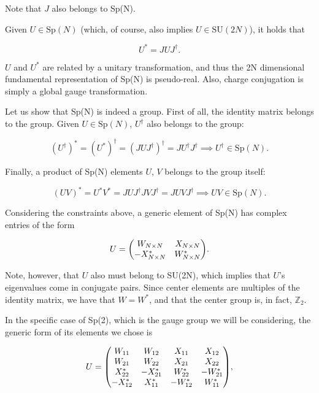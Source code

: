 \documentclass[reqno,12pt]{article}
\numberwithin{equation}{section}
\newcommand{\SU}{\mathrm{SU}}
\newcommand{\Sp}{\mathrm{Sp}}
\begin{document}
Note that $J$ also belongs to Sp(N).

Given $U \in \Sp(N)$ (which, of course, also implies $U \in \SU(2N)$), it holds that

\begin{equation}
	U^* = J U J^\dagger.
\end{equation}

$U$ and $U^*$ are related by a unitary transformation, and thus the 2N dimensional fundamental representation of Sp(N) is pseudo-real.
Also, charge conjugation is simply a global gauge transformation.

Let us show that Sp(N) is indeed a group. First of all, the identity matrix belongs to the group. Given $U \in \Sp(N)$, $U^\dagger$ also
belongs to the group:

\begin{equation}
	(U^\dagger)^* = (U^*)^\dagger = (J U J^\dagger)^\dagger = J U^\dagger J^\dagger \implies U^\dagger \in \Sp(N).
\end{equation}

Finally, a product of Sp(N) elements $U$, $V$ belongs to the group itself:

\begin{equation}
	(U V)^* = U^* V^* = J U J^\dagger J V J^\dagger = J U V J^\dagger \implies UV \in \Sp(N).
\end{equation}

Considering the constraints above, a generic element of Sp(N) has complex entries of the form

\begin{equation}
	U = \mqty(W_{N \times N} & X_{N \times N} \\ -X_{N \times N}^* & W_{N \times N}^*).
\end{equation}

Note, however, that $U$ also must belong to SU(2N), which implies that $U$'s eigenvalues come in conjugate pairs. Since center elements
are multiples of the identity matrix, we have that $W = W^*$, and that the center group is, in fact, $\mathbb{Z}_2$.

In the specific case of Sp(2), which is the gauge group we will be considering, the generic form of its elements we chose is

\begin{equation}
	U = \mqty(
		W_{11} & W_{12} & X_{11} & X_{12} \\
		W_{21} & W_{22} & X_{21} & X_{22} \\
		X^*_{22} & -X^*_{21} & W^*_{22} & -W^*_{21} \\
		-X^*_{12} & X^*_{11} & -W^*_{12} & W^*_{11}
	),
\end{equation}
\end{document}
